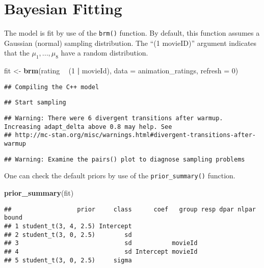 \documentclass[
]{book}
\newenvironment{Shaded}{\begin{snugshade}}{\end{snugshade}}
\newcommand{\DataTypeTok}[1]{\textcolor[rgb]{0.13,0.29,0.53}{#1}}
\newcommand{\DecValTok}[1]{\textcolor[rgb]{0.00,0.00,0.81}{#1}}
\newcommand{\KeywordTok}[1]{\textcolor[rgb]{0.13,0.29,0.53}{\textbf{#1}}}
\newcommand{\NormalTok}[1]{#1}
\newcommand{\OperatorTok}[1]{\textcolor[rgb]{0.81,0.36,0.00}{\textbf{#1}}}
\newcommand{\StringTok}[1]{\textcolor[rgb]{0.31,0.60,0.02}{#1}}
\begin{document}
\hypertarget{bayesian-fitting}{%
\section{Bayesian Fitting}\label{bayesian-fitting}}

The model is fit by use of the \texttt{brm()} function. By default, this function assumes a Gaussian (normal) sampling distribution. The ``(1 \textbar{} movieID)'' argument indicates that the \(\mu_1, ..., \mu_8\) have a random distribution.

\begin{Shaded}
\begin{Highlighting}[]
\NormalTok{fit <-}\StringTok{ }\KeywordTok{brm}\NormalTok{(rating }\OperatorTok{~}\StringTok{ }\NormalTok{(}\DecValTok{1} \OperatorTok{|}\StringTok{ }\NormalTok{movieId),}
           \DataTypeTok{data =}\NormalTok{ animation_ratings,}
           \DataTypeTok{refresh =} \DecValTok{0}\NormalTok{)}
\end{Highlighting}
\end{Shaded}

\begin{verbatim}
## Compiling the C++ model
\end{verbatim}

\begin{verbatim}
## Start sampling
\end{verbatim}

\begin{verbatim}
## Warning: There were 6 divergent transitions after warmup. Increasing adapt_delta above 0.8 may help. See
## http://mc-stan.org/misc/warnings.html#divergent-transitions-after-warmup
\end{verbatim}

\begin{verbatim}
## Warning: Examine the pairs() plot to diagnose sampling problems
\end{verbatim}

One can check the default priors by use of the \texttt{prior\_summary()} function.

\begin{Shaded}
\begin{Highlighting}[]
\KeywordTok{prior_summary}\NormalTok{(fit)}
\end{Highlighting}
\end{Shaded}

\begin{verbatim}
##                  prior     class      coef   group resp dpar nlpar bound
## 1 student_t(3, 4, 2.5) Intercept                                        
## 2 student_t(3, 0, 2.5)        sd                                        
## 3                             sd           movieId                      
## 4                             sd Intercept movieId                      
## 5 student_t(3, 0, 2.5)     sigma
\end{verbatim}
\end{document}
